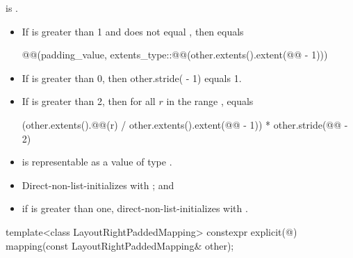 \begin{itemdescr}
\pnum
\constraints
{} is .

\pnum
\expects
\begin{itemize}
\item
If  is greater than 1 and
 does not equal ,
then  equals
\begin{codeblock}
@@(padding_value,
                        extents_type::@@(other.extents().extent(@@ - 1)))
\end{codeblock}
\item
If  is greater than 0,
then other.stride( - 1) equals 1.
\item
If  is greater than 2,
then for all $r$ in the range ,
 equals
\begin{codeblock}
(other.extents().@@(r) / other.extents().extent(@@ - 1)) *
  other.stride(@@ - 2)
\end{codeblock}
\item
{} is representable as
a value of type .
\end{itemize}

\pnum
\effects
\begin{itemize}
\item
Direct-non-list-initializes  with ; and
\item
if  is greater than one,
direct-non-list-initializes 
with .
\end{itemize}
\end{itemdescr}

%
\begin{itemdecl}
template<class LayoutRightPaddedMapping>
  constexpr explicit(@\seebelow@)
    mapping(const LayoutRightPaddedMapping& other);
\end{itemdecl}

